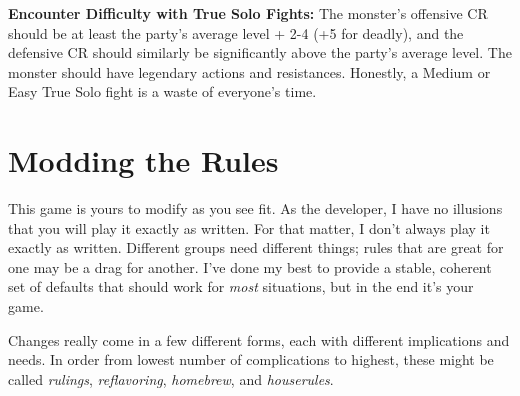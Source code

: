 \documentclass[10pt,twoside,openany,bg=none]{dndbook}
\begin{document}
\textbf{Encounter Difficulty with True Solo Fights:} The monster's offensive CR should be at least the party's average level + 2-4 (+5 for deadly), and the defensive CR should similarly be significantly above the party's average level. The monster should have legendary actions and resistances. Honestly, a Medium or Easy True Solo fight is a waste of everyone's time.

\section{Modding the Rules}\label{sec:modding-the-rules}
This game is yours to modify as you see fit. As the developer, I have no illusions that you will play it exactly as written. For that matter, I don't always play it exactly as written. Different groups need different things; rules that are great for one may be a drag for another. I've done my best to provide a stable, coherent set of defaults that should work for \textit{most} situations, but in the end it's your game.

Changes really come in a few different forms, each with different implications and needs. In order from lowest number of complications to highest, these might be called \textit{rulings}, \textit{reflavoring}, \textit{homebrew}, and \textit{houserules}.
\end{document}
